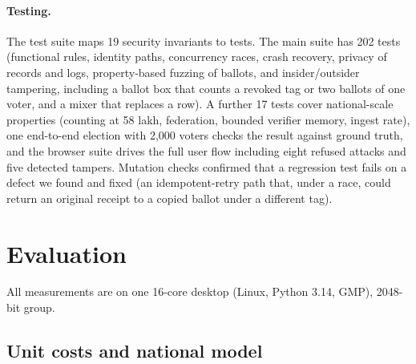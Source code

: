 \documentclass[runningheads]{llncs}
\begin{document}
\paragraph{Testing.} The test suite maps 19 security invariants to tests. The main suite has 202 tests (functional rules, identity paths, concurrency races, crash recovery, privacy of records and logs, property-based fuzzing of ballots, and insider/outsider tampering, including a ballot box that counts a revoked tag or two ballots of one voter, and a mixer that replaces a row). A further 17 tests cover national-scale properties (counting at 58 lakh, federation, bounded verifier memory, ingest rate), one end-to-end election with 2,000 voters checks the result against ground truth, and the browser suite drives the full user flow including eight refused attacks and five detected tampers. Mutation checks confirmed that a regression test fails on a defect we found and fixed (an idempotent-retry path that, under a race, could return an original receipt to a copied ballot under a different tag).

\section{Evaluation}\label{sec:eval}

All measurements are on one 16-core desktop (Linux, Python 3.14, GMP), 2048-bit group.

\subsection{Unit costs and national model}\label{sec:capacity}
\end{document}
